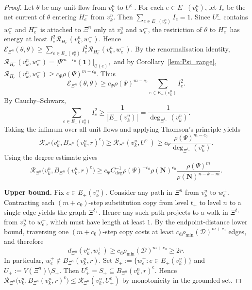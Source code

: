 \documentclass{article}
\theoremstyle{plain}
\theoremstyle{definition}
\newcommand{\dist}{\mathrm{d}}
\newcommand{\Reff}{\mathscr{R}}
\begin{document}
\begin{proof}
Let $\theta$ be any unit flow from $v_k^n$ to $U_-^{\mathrm c}$.
For each $e\in E_-(v_k^n)$, let $I_e$ be the net current of $\theta$ entering $H_e^-$ from $v_k^n$.
Then $\sum_{e\in E_-(v_k^n)} I_e=1$.
Since $U_-^{\mathrm c}$ contains $w_e^-$ and $H_e^-$ is attached to $\Xi^n$ only at $v_k^n$ and $w_e^-$, the restriction of $\theta$ to $H_e^-$ has energy at least
$
I_e^2 \Reff_{H_e^-}(v_k^n,w_e^-).
$
Hence
$
\mathcal E_{\Xi^n}(\theta,\theta)
\ge
\sum_{e\in E_-(v_k^n)} I_e^2 \Reff_{H_e^-}(v_k^n,w_e^-).
$
By the renormalisation identity,
$
\Reff_{H_e^-}(v_k^n,w_e^-)=\big[\Psi^{m-c_0}(\mathbf 1)\big]_{\mathscr C(e)},
$
and by Corollary~\ref{lem:Psi_range},
$
\Reff_{H_e^-}(v_k^n,w_e^-)\ge c_{\Psi}\rho(\Psi)^{m-c_0}.
$
Thus
\[
\mathcal E_{\Xi^n}(\theta,\theta)
\ge
c_{\Psi}\rho(\Psi)^{m-c_0}\sum_{e\in E_-(v_k^n)} I_e^2.
\]
By Cauchy--Schwarz,
\[
\sum_{e\in E_-(v_k^n)} I_e^2
\ge
\frac{1}{|E_-(v_k^n)|}
=
\frac{1}{\deg_{\Xi^{t_-}}(v_k^n)}.
\]
Taking the infimum over all unit flows and applying Thomson's principle yields
\[
\Reff_{\Xi^n}\bigl(v_k^n,B_{\Xi^n}(v_k^n,r)^{\mathrm c}\bigr)
\ge
\Reff_{\Xi^n}(v_k^n,U_-^{\mathrm c})
\ge
c_{\Psi}\frac{\rho(\Psi)^{m-c_0}}{\deg_{\Xi^{t_-}}(v_k^n)}.
\]
Using the degree estimate gives
\[
\Reff_{\Xi^n}\bigl(v_k^n,B_{\Xi^n}(v_k^n,r)^{\mathrm c}\bigr)
\ge
c_{\Psi} C_{\deg}^{-1} \rho(\Psi)^{-c_0} \rho(\mathbf N)^{c_0}
\frac{\rho(\Psi)^m}{\rho(\mathbf N)^{n-k-m}}.
\]

\textbf{Upper bound.}
Fix $e\in E_+(v_k^n)$.
Consider any path in $\Xi^n$ from $v_k^n$ to $w_e^+$.
Contracting each $(m+c_0)$-step substitution copy from level $t_+$ to level $n$ to a single edge yields the graph $\Xi^{t_+}$.
Hence any such path projects to a walk in $\Xi^{t_+}$ from $v_k^n$ to $w_e^+$, which must have length at least $1$.
By the endpoint-distance lower bound, traversing one $(m+c_0)$-step copy costs at least $c_{\dist}\rho_{\min}(\mathcal D)^{m+c_0}$ edges, and therefore
\[
d_{\Xi^n}(v_k^n,w_e^+)\ge c_{\dist}\rho_{\min}(\mathcal D)^{m+c_0}\ge 2r.
\]
In particular, $w_e^+\notin B_{\Xi^n}(v_k^n,r)$.
Set
$
S_+:=\{w_e^+:e\in E_+(v_k^n)\}
$
and
$
U_+:=V(\Xi^n)\setminus S_+.
$
Then $U_+^{\mathrm c}=S_+\subseteq B_{\Xi^n}(v_k^n,r)^{\mathrm c}$.
Hence
$
\Reff_{\Xi^n}\bigl(v_k^n,B_{\Xi^n}(v_k^n,r)^{\mathrm c}\bigr)
\le
\Reff_{\Xi^n}(v_k^n,U_+^{\mathrm c})
$
by monotonicity in the grounded set.


\end{proof}
\end{document}
